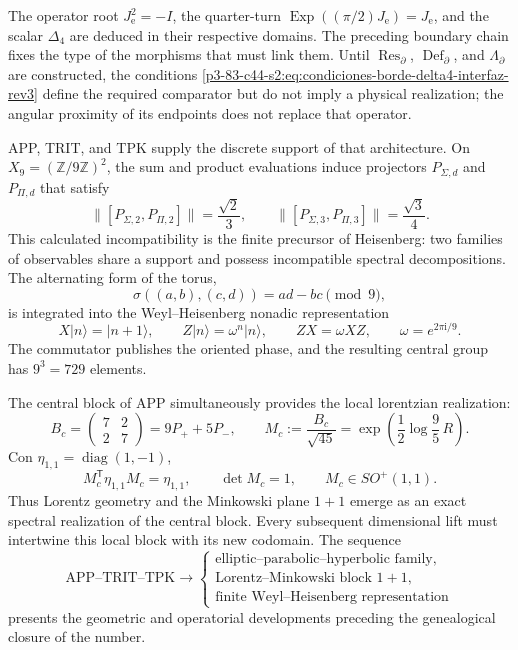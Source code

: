 \begin{remark}
The operator root \(J_{\mathrm e}^2=-I\), the quarter-turn
\(\operatorname{Exp}((\pi/2)J_{\mathrm e})=J_{\mathrm e}\), and the scalar
\(\Delta_4\) are deduced in their respective domains. The preceding boundary
chain fixes the type of the morphisms that must link them. Until
\(\operatorname{Res}_{\partial}\), \(\operatorname{Def}_{\partial}\), and
\(\Lambda_{\partial}\) are constructed, the conditions
\eqref{p3-83-c44-s2:eq:condiciones-borde-delta4-interfaz-rev3} define the required comparator
but do not imply a physical realization; the angular proximity of
its endpoints does not replace that operator.
\end{remark}

APP, TRIT, and TPK supply the discrete support of that architecture. On
\(X_9=(\mathbb Z/9\mathbb Z)^2\), the sum and product evaluations induce
projectors \(P_{\Sigma,d}\) and \(P_{\Pi,d}\) that satisfy
\[
 \|[P_{\Sigma,2},P_{\Pi,2}]\|=\frac{\sqrt2}{3},
 \qquad
 \|[P_{\Sigma,3},P_{\Pi,3}]\|=\frac{\sqrt3}{4}.
\]
This calculated incompatibility is the finite precursor of Heisenberg: two
families of observables share a support and possess incompatible spectral
decompositions. The alternating form of the torus,
\[
 \sigma((a,b),(c,d))=ad-bc\pmod9,
\]
is integrated into the Weyl--Heisenberg nonadic representation
\[
 X|n\rangle=|n+1\rangle,\qquad
 Z|n\rangle=\omega^n|n\rangle,\qquad
 ZX=\omega XZ,
 \qquad \omega=e^{2\pi\mathrm i/9}.
\]
The commutator publishes the oriented phase, and the resulting central group has
\(9^3=729\) elements.

The central block of APP simultaneously provides the local lorentzian realization:
\[
 B_c=
 \begin{pmatrix}7&2\\2&7\end{pmatrix}
 =9P_++5P_-,
 \qquad
 M_c:=\frac{B_c}{\sqrt{45}}
 =\exp\!\left(\frac12\log\frac95\,R\right).
\]
Con \(\eta_{1,1}=\operatorname{diag}(1,-1)\),
\[
 M_c^{\mathsf T}\eta_{1,1}M_c=\eta_{1,1},
 \qquad
 \det M_c=1,
 \qquad
 M_c\in SO^+(1,1).
\]
Thus Lorentz geometry and the Minkowski plane \(1+1\) emerge as an
exact spectral realization of the central block. Every subsequent dimensional
lift must intertwine this local block with its new codomain. The sequence
\[
 \boxed{
 \text{APP--TRIT--TPK}
 \longrightarrow
 \begin{cases}
 \text{elliptic--parabolic--hyperbolic family},\\
 \text{Lorentz--Minkowski block }1+1,\\
 \text{finite Weyl--Heisenberg representation}
 \end{cases}}
\]
presents the geometric and operatorial developments preceding the genealogical closure of the number.

